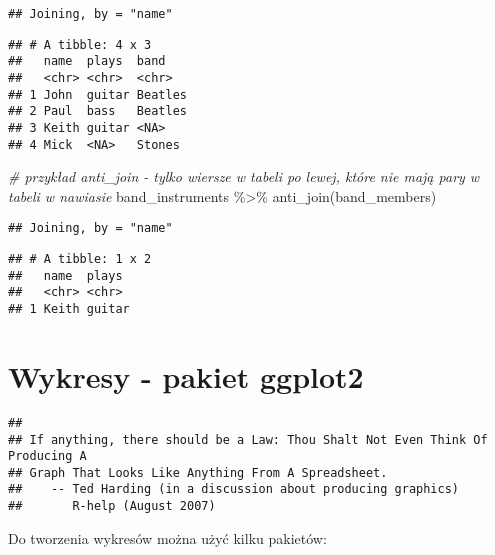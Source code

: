 \documentclass[
]{book}
\newenvironment{Shaded}{\begin{snugshade}}{\end{snugshade}}
\newcommand{\CommentTok}[1]{\textcolor[rgb]{0.56,0.35,0.01}{\textit{#1}}}
\newcommand{\FunctionTok}[1]{\textcolor[rgb]{0.00,0.00,0.00}{#1}}
\newcommand{\NormalTok}[1]{#1}
\newcommand{\SpecialCharTok}[1]{\textcolor[rgb]{0.00,0.00,0.00}{#1}}
\begin{document}
\begin{verbatim}
## Joining, by = "name"
\end{verbatim}

\begin{verbatim}
## # A tibble: 4 x 3
##   name  plays  band   
##   <chr> <chr>  <chr>  
## 1 John  guitar Beatles
## 2 Paul  bass   Beatles
## 3 Keith guitar <NA>   
## 4 Mick  <NA>   Stones
\end{verbatim}

\begin{Shaded}
\begin{Highlighting}[]
\CommentTok{\# przykład anti\_join {-} tylko wiersze w tabeli po lewej, które nie mają pary w tabeli w nawiasie}
\NormalTok{band\_instruments }\SpecialCharTok{\%\textgreater{}\%} \FunctionTok{anti\_join}\NormalTok{(band\_members)}
\end{Highlighting}
\end{Shaded}

\begin{verbatim}
## Joining, by = "name"
\end{verbatim}

\begin{verbatim}
## # A tibble: 1 x 2
##   name  plays 
##   <chr> <chr> 
## 1 Keith guitar
\end{verbatim}

\hypertarget{wykresy---pakiet-ggplot2}{%
\chapter{Wykresy - pakiet ggplot2}\label{wykresy---pakiet-ggplot2}}

\begin{verbatim}
## 
## If anything, there should be a Law: Thou Shalt Not Even Think Of Producing A
## Graph That Looks Like Anything From A Spreadsheet.
##    -- Ted Harding (in a discussion about producing graphics)
##       R-help (August 2007)
\end{verbatim}

Do tworzenia wykresów można użyć kilku pakietów:
\end{document}
